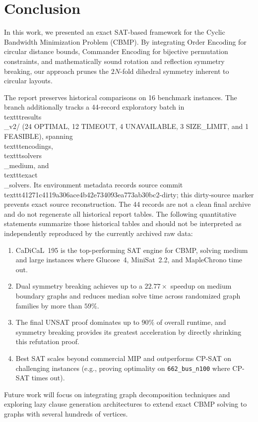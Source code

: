 \documentclass[a4paper,fleqn]{cas-sc}
\begin{document}

\section{Conclusion}

In this work, we presented an exact SAT-based framework for the Cyclic Bandwidth Minimization Problem (CBMP). By integrating Order Encoding for circular distance bounds, Commander Encoding for bijective permutation constraints, and mathematically sound rotation and reflection symmetry breaking, our approach prunes the $2N$-fold dihedral symmetry inherent to circular layouts.

The report preserves historical comparisons on 16 benchmark instances. The branch additionally tracks a 44-record exploratory batch in \\texttt{results\\_v2/} (24 OPTIMAL, 12 TIMEOUT, 4 UNAVAILABLE, 3 SIZE_LIMIT, and 1 FEASIBLE), spanning \\texttt{encodings}, \\texttt{solvers\\_medium}, and \\texttt{exact\\_solvers}. Its environment metadata records source commit \\texttt{41271c4119a306ace4b42e734093ea773ab30bc2-dirty}; this dirty-source marker prevents exact source reconstruction. The 44 records are not a clean final archive and do not regenerate all historical report tables. The following quantitative statements summarize those historical tables and should not be interpreted as independently reproduced by the currently archived raw data:
\begin{enumerate}
    \item CaDiCaL~195 is the top-performing SAT engine for CBMP, solving medium and large instances where Glucose~4, MiniSat~2.2, and MapleChrono time out.
    \item Dual symmetry breaking achieves up to a $22.77\times$ speedup on medium boundary graphs and reduces median solve time across randomized graph families by more than $59\%$.
    \item The final UNSAT proof dominates up to $90\%$ of overall runtime, and symmetry breaking provides its greatest acceleration by directly shrinking this refutation proof.
    \item Best SAT scales beyond commercial MIP and outperforms CP-SAT on challenging instances (e.g., proving optimality on \texttt{662\_bus\_n100} where CP-SAT times out).
\end{enumerate}
Future work will focus on integrating graph decomposition techniques and exploring lazy clause generation architectures to extend exact CBMP solving to graphs with several hundreds of vertices.
\end{document}
